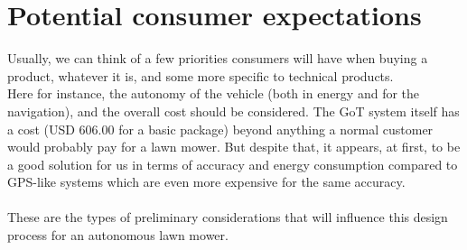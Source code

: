 \section{Potential consumer expectations}
Usually, we can think of a few priorities consumers will have when buying a product, whatever it is, and some more specific to technical products.\\
\noindent
Here for instance, the autonomy of the vehicle (both in energy and for the navigation), and the overall cost should be considered. The GoT system itself has a cost (USD 606.00 for a basic package) beyond anything a normal customer would probably pay for a lawn mower. But despite that, it appears, at first, to be a good solution for us in terms of accuracy and energy consumption compared to GPS-like systems which are even more expensive for the same accuracy.  \\\\
\noindent
These are the types of preliminary considerations that will influence this design process for an autonomous lawn mower.
